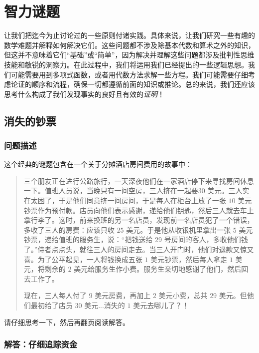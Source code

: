 \section{智力谜题}\label{sec:section1.4}

让我们把迄今为止讨论过的一些原则付诸实践。具体来说，让我们研究一些有趣的数学难题并解释如何解决它们。这些问题都不涉及除基本代数和算术之外的知识，但这并不意味着它们``基础''或``简单''，因为解决并理解这些问题都涉及批判性思维技能和敏锐的洞察力。在此过程中，我们将运用我们已经提出的一些逻辑思想。我们可能需要用到多项式函数，或者用代数方法求解一些方程。我们可能需要仔细考虑论证的顺序和流程，确保一切都遵循前面的知识或推论。总的来说，我们还应该思考什么构成了我们发现事实的良好且有效的\textit{证明}！

\subsection{消失的钞票}

\subsubsection*{问题描述}

这个经典的谜题包含在一个关于分摊酒店房间费用的故事中：

\begin{quote}
    三个朋友正在进行公路旅行，一天深夜他们在一家酒店停下来寻找房间休息一下。值班人员说，当晚只有一间空房，三人挤在一起要$30$ 美元。三人实在太困了，于是他们同意挤一间房间，于是每人在柜台上放了一张 $10$ 美元钞票作为预付款。店员向他们表示感谢，递给他们钥匙，然后三人就去车上拿行李了。这时，前来换班的另一名店员，发现前一名店员犯了一个错误，多收了三人的房费：应该只收 $25$ 美元。于是他从收银机里拿出一张 $5$ 美元钞票，递给值班的服务生，说：``把钱送给 29 号房间的客人，多收他们钱了。''侍者点点头，就往三人的房间走去。当三人开门时，他们对退款又惊又喜。为了公平起见，一人将钱换成五张 $1$ 美元钞票，然后每人拿走 $1$ 美元，将剩余的 $2$ 美元给服务生作小费。服务生亲切地感谢了他们，然后回去工作了。

    现在，三人每人付了 $9$ 美元房费，再加上 $2$ 美元小费，总共 $29$ 美元。但他们最初给了店员 $30$ 美元...消失的 $1$ 美元去哪儿了？！
\end{quote}

请仔细思考一下，然后再翻页阅读解答。

\clearpage

\subsubsection*{解答：仔细追踪资金}

